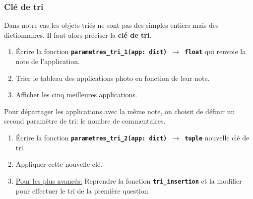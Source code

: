\documentclass[a4paper,11pt]{article}
\begin{document}
\subsubsection{Clé de tri}
Dans notre cas les objets triés ne sont pas des simples entiers mais des dictionnaires. Il faut alors préciser la \textbf{clé de tri}.

\begin{activite}
    \begin{enumerate}
        \item Écrire la fonction \textbf{\texttt{parametres\_tri\_1(app: dict) $\rightarrow$ float}} qui renvoie la note de l'application.
        \item Trier le tableau des applications photo en fonction de leur note.
        \item Afficher les cinq meilleures applications.
    \end{enumerate}
    Pour départager les applications avec la même note, on choisit de définir un second paramètre de tri: le nombre de commentaires.
    \begin{enumerate}[resume]
        \item Écrire la fonction \textbf{\texttt{parametres\_tri\_2(app: dict) $\rightarrow$ tuple}} nouvelle clé de tri.
        \item Appliquer cette nouvelle clé.
        \item \underline{Pour les plus avancés:} Reprendre la fonction \textbf{\texttt{tri\_insertion}} et la modifier pour effectuer le tri de la première question.
    \end{enumerate}
    \end{activite}
\end{document}
